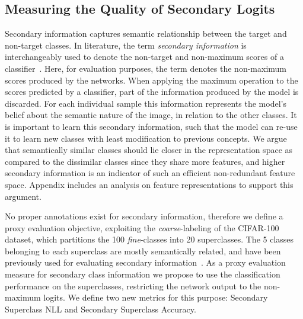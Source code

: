 \documentclass[final]{cvpr}
\begin{document}
\subsection{Measuring the Quality of Secondary Logits}
Secondary information captures semantic relationship between the target and non-target classes.
In literature, the term \textit{secondary information} is interchangeably used to denote the non-target and non-maximum scores of a classifier~\cite{kdingen_2019_AAAI}. 
Here, for evaluation purposes, the term denotes the non-maximum scores produced by the networks.
When applying the maximum operation to the scores predicted by a classifier, part of the information produced by the model is discarded.
For each individual sample this information represents the model's belief about the semantic nature of the image, in relation to the other classes.
It is important to learn this secondary information, such that the model can re-use it to learn new classes with least modification to previous concepts.
We argue that semantically similar classes should lie closer in the representation space as compared to the dissimilar classes since they share more features, and higher secondary information is an indicator of such an efficient non-redundant feature space. Appendix includes an analysis on feature representations to support this argument.

No proper annotations exist for secondary information, therefore we define a proxy evaluation objective, exploiting the  \textit{coarse}-labeling of the CIFAR-100 dataset, which partitions the 100 \textit{fine}-classes into 20 superclasses. The 5 classes belonging to each superclass are mostly semantically related, and have been previously used for evaluating secondary information~\cite{kdingen_2019_AAAI}.
As a proxy evaluation measure for secondary class information we propose to use the classification performance on the superclasses, restricting the network output to the non-maximum logits. We define two new metrics for this purpose: Secondary Superclass NLL and Secondary Superclass Accuracy.
\end{document}
